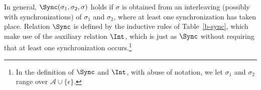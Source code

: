 %



In general, $\Sync(\sigma_1, \sigma_2, \sigma)$ holds
if $\sigma$ is obtained from an interleaving (possibly with synchronizations) of $\sigma_1$ and $\sigma_2$, 
where at least one synchronization has taken place. 
Relation $\Sync$ is defined by the inductive rules of Table~\ref{b-sync}, which make use of the auxiliary
relation $\Int$, which is just as $\Sync$ without requiring that at least one synchronization occurs.\footnote{In the definition 
of $\Sync$ and $\Int$, with abuse of notation, we let $\sigma_1$ and $\sigma_2$ range over $\mathcal{A} \cup \{\epsilon\}$.}



